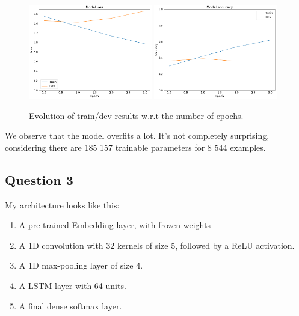 \documentclass[11pt]{enpc-article}
\begin{document}
\begin{figure}[H]
  \centering
  \includegraphics[width=0.48\textwidth]{learning_curve.png}
  \includegraphics[width=0.48\textwidth]{learning_curve_accuracy.png}
  \caption{Evolution of train/dev results w.r.t the number of epochs.}
\end{figure}

We observe that the model overfits a lot. It's not completely surprising, considering there are 185 157 trainable parameters for 8 544 examples.

\subsection*{Question 3}

My architecture looks like this:
\begin{enumerate}
  \item A pre-trained Embedding layer, with frozen weights
  \item A 1D convolution with 32 kernels of size 5, followed by a ReLU activation.
  \item A 1D max-pooling layer of size 4.
  \item A LSTM layer with 64 units.
  \item A final dense softmax layer.
\end{enumerate}
\end{document}
